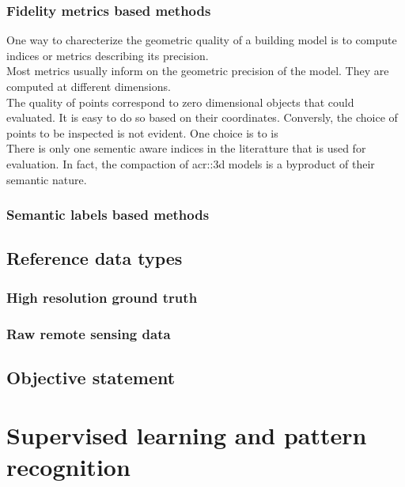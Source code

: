         \subsubsection{Fidelity metrics based methods}
            One way to charecterize the geometric quality of a building model is to compute indices or metrics describing its precision.\\

            Most metrics usually inform on the geometric precision of the model.
            They are computed at different dimensions.\\
            The quality of points correspond to zero dimensional objects that could evaluated.
            It is easy to do so based on their coordinates.
            Conversly, the choice of points to be inspected is not evident.
            One choice is to is \\

            There is only one sementic aware indices in the literatture that is used for evaluation.
            In fact, the compaction of \gls{acr::3d} models is a byproduct of their semantic nature.

        \subsubsection{Semantic labels based methods}

    \subsection{Reference data types}
        \label{subsec::state_of_the_art::quality::reference}

        \subsubsection{High resolution ground truth}

        \subsubsection{Raw remote sensing data}

    \subsection{Objective statement}
\section{Supervised learning and pattern recognition}
